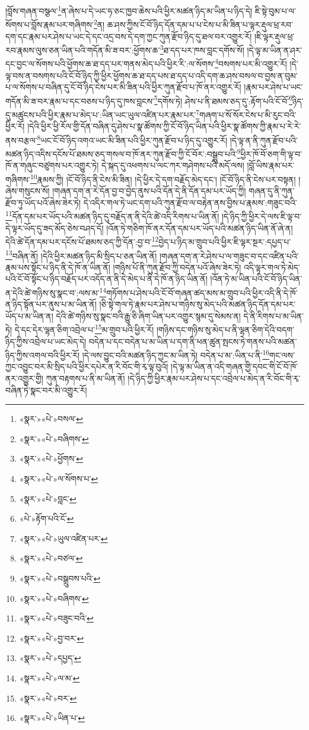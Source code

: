 །བློས་གཞན་བསྩལ་\footnote{«སྣར་»«པེ་»བསལ་}ན་ཞེས་པ་དེ་ཡང་ཧ་ཅང་ཁྱབ་ཆེས་པའི་ཕྱིར་མཚན་ཉིད་མ་ཡིན་པ་ཉིད་དེ། ཇི་སྟེ་བུམ་པ་ལ་སོགས་པ་བློས་རྣམ་པར་གཞིགས་\footnote{«སྣར་»«པེ་»བཞིགས་}ན། ཆ་ཤས་ཀྱིས་ངོ་བོ་ཉིད་དོན་དམ་པ་པ་ངེས་པ་མི་ཟིན་པ་ལྟར་རྡུལ་ཕྲ་རབ་དག་དང་རྣམ་པར་ཤེས་པ་ཡང་དེ་དང་འདྲ་བས་དེ་དག་ཀྱང་ཀུན་རྫོབ་ཉིད་དུ་ཐལ་བར་འགྱུར་རོ། །ཇི་ལྟར་རྡུལ་ཕྲ་རབ་རྣམས་ལུས་ཅན་ཡིན་པའི་གདོན་མི་ཟ་བར་:ཕྱོགས་ཆ་\footnote{«སྣར་»«པེ་»ཕྱོགས་}ཐ་དད་པར་ཁས་བླང་དགོས་སོ། །དེ་ལྟ་མ་ཡིན་ན་ཤར་དང་བྱང་ལ་སོགས་པའི་ཕྱོགས་ཆ་ཐ་དད་པར་གནས་མེད་པའི་ཕྱིར་རི་:ལ་སོགས་\footnote{«སྣར་»«པེ་»ལ་སོགས་པ་}བསགས་པར་མི་འགྱུར་རོ། །དེ་ལྟ་བས་ན་བསགས་པའི་ངོ་བོ་ཉིད་ཀྱི་ཕྱིར་ཕྱོགས་ཆ་ཐ་དད་པས་ཐ་དད་པ་འདི་དག་ཆ་ཤས་བསལ་བ་བྱས་ན་བུམ་པ་ལ་སོགས་པ་བཞིན་དུ་ངོ་བོ་ཉིད་ངེས་པར་མི་ཟིན་པའི་ཕྱིར་ཀུན་རྫོབ་པ་ཁོ་ནར་འགྱུར་རོ། །རྣམ་པར་ཤེས་པ་ཡང་གདོན་མི་ཟ་བར་རྣམ་པ་དང་བཅས་པ་ཉིད་དུ་ཁས་བླངས་\footnote{«སྣར་»«པེ་»བླང་}དགོས་ཏེ། ཤེས་པ་ནི་ཐམས་ཅད་དུ་:རྟོག་པའི་ངོ་བོ་\footnote{«པེ་»རྟོག་པའི་ངོ་}ཉིད་དུ་མཚུངས་པའི་ཕྱིར་རྣམ་པ་མེད་པ་:ཡིན་ཡང་ཡུལ་འཛིན་པར་རྣམ་པར་\footnote{«སྣར་»«པེ་»ཡུལ་འཛིན་པར་}གཞག་པ་སོ་སོར་ངེས་པ་མི་རུང་བའི་ཕྱིར་རོ། །དེའི་ཕྱིར་ཕྱི་རོལ་གྱི་དོན་བཞིན་དུ་ཤེས་པ་སྣ་ཚོགས་ཀྱི་ངོ་བོ་ཉིད་ཡིན་པའི་ཕྱིར་སྣ་ཚོགས་ཀྱི་རྣམ་པ་རེ་རེ་ནས་བརྩལ་\footnote{«སྣར་»«པེ་»བཙལ་}ཡང་ངོ་བོ་ཉིད་འགའ་ཡང་མི་ཟིན་པའི་ཕྱིར་ཀུན་རྫོབ་པ་ཉིད་དུ་འགྱུར་རོ། །དེ་ལྟ་ན་ནི་ཀུན་རྫོབ་པའི་མཚན་ཉིད་འདིས་དངོས་པོ་ཐམས་ཅད་གསལ་བ་ཁོ་ནར་ཀུན་རྫོབ་ཀྱི་ངོ་བོར་:བསྒྲུབ་པའི་\footnote{«སྣར་»«པེ་»བསྒྲུབས་པའི་}ཕྱིར་ཁོ་བོ་ཅག་གི་ལྟ་བ་ཁོ་ན་གཞུང་བཙུགས་པར་འགྱུར་ཏེ། དེ་སྐད་དུ་འཕགས་པ་ལང་ཀར་གཤེགས་པའི་མདོ་ལས། །བློ་ཡིས་རྣམ་པར་གཞིགས་\footnote{«སྣར་»«པེ་»བཞིགས་}རྣམས་ཀྱི། །ངོ་བོ་ཉིད་ནི་ངེས་མི་ཟིན། །དེ་ཕྱིར་དེ་དག་བརྗོད་མེད་དང་། །ངོ་བོ་ཉིད་ནི་ངེས་པར་བསྟན། །ཞེས་གསུངས་སོ། །གཞན་དག་ན་རེ་དོན་བྱ་བ་བྱེད་ནུས་པའི་དོན་དེ་ནི་དོན་དམ་པར་ཡོད་ཀྱི། གཞན་དུ་ནི་ཀུན་རྫོབ་ཏུ་ཡོད་པའོ་ཞེས་ཟེར་ཏེ། དེ་འདིར་གལ་ཏེ་ཡང་དག་པའི་ཀུན་རྫོབ་ལ་བརྟེན་ནས་བྱིས་པ་རྣམས་:གཟུང་བའི་\footnote{«སྣར་»«པེ་»བཟུང་བའི་}དོན་དམ་པར་ཡོད་པའི་མཚན་ཉིད་དུ་བརྗོད་ན་ནི་དེའི་ཚེ་འདི་རིགས་པ་ཡིན་ནོ། །དེ་ཉིད་ཀྱི་ཕྱིར་དེ་ལས་ཇི་ལྟ་བ་དེ་ལྟར་ཡོད་དུ་ཟད་མོད་ཅེས་བཤད་དོ། །འོན་ཏེ་གཅིག་ཁོ་ནར་དོན་དམ་པར་ཡོད་པའི་མཚན་ཉིད་ཡིན་ནོ་ཞེ་ན། དེའི་ཚེ་དོན་དམ་པར་དངོས་པོ་ཐམས་ཅད་ཀྱི་དོན་:བྱ་བ་\footnote{«སྣར་»«པེ་»བྱ་བར་}བྱེད་པ་ཉིད་མ་གྲུབ་པའི་ཕྱིར་ཇི་ལྟར་སྔར་:དཔྱད་པ་\footnote{«སྣར་»«པེ་»དཔྱད་}བཞིན་ནོ། །དེའི་ཕྱིར་མཚན་ཉིད་མི་སྲིད་པ་ཅན་ཡིན་ནོ། །གཞན་དག་ན་རེ་ཤེས་པ་ལ་གཟུང་བ་དང་འཛིན་པའི་རྣམ་པས་སྟོང་པ་ཉིད་ནི་དེ་ཁོ་ན་ཡིན་ནོ། །གཉིས་པོ་ནི་ཀུན་རྫོབ་ཀྱི་བདེན་པའོ་ཞེས་ཟེར་ཏེ། འདི་ལྟར་གལ་ཏེ་མེད་པའི་ངོ་བོ་སྟོང་པ་ཉིད་བརྗོད་པར་འདོད་ན་ནི་དེ་མེད་པ་ནི་དེ་ཁོ་ན་ཉིད་ཡིན་ནོ། །འོན་ཏེ་མ་ཡིན་པའི་ངོ་བོ་ཉིད་ཡིན་ན་དེའི་ཚེ་གཉིས་སུ་སྣང་བ་:ལས་མ་\footnote{«སྣར་»«པེ་»ལ་མ་}གཏོགས་པ་ཤེས་པའི་ངོ་བོ་གཞན་ཚད་མས་མ་གྲུབ་པའི་ཕྱིར་འདི་ནི་དེ་ཁོ་ན་ཉིད་སྟོན་པར་ནུས་པ་མ་ཡིན་ནོ། །ཅི་སྟེ་གལ་ཏེ་རྣམ་པར་ཤེས་པ་གཉིས་སུ་མེད་པའི་མཚན་ཉིད་དོན་དམ་པར་ཡོད་པ་མ་ཡིན་ན། དེའི་ཚེ་གཉིས་སུ་སྣང་བའི་རྒྱུ་ཅི་ཞིག་ཡིན་པར་འགྱུར་སྙམ་དུ་སེམས་ན། དེ་ནི་རིགས་པ་མ་ཡིན་ཏེ། དེ་དང་དེར་ལྷན་ཅིག་འབྲེལ་པ་\footnote{«སྣར་»«པེ་»བར་}མ་གྲུབ་པའི་ཕྱིར་རོ། །གཉིས་དང་གཉིས་སུ་མེད་པ་ནི་ལྷན་ཅིག་དེའི་བདག་ཉིད་ཀྱིས་འབྲེལ་པ་ཡང་མེད་དེ། བདེན་པ་དང་བདེན་པ་མ་ཡིན་པ་དག་ནི་ཕན་ཚུན་སྤངས་ཏེ་གནས་པའི་མཚན་ཉིད་ཀྱིས་འགལ་བའི་ཕྱིར་རོ། །དེ་ལས་བྱུང་བའི་མཚན་ཉིད་ཀྱང་མ་ཡིན་ཏེ། བདེན་པ་མ་:ཡིན་པ་ནི་\footnote{«སྣར་»«པེ་»ཡིན་པ་}གང་ལས་ཀྱང་འབྱུང་བར་མི་སྲིད་པའི་ཕྱིར་དཔེར་ན་རི་བོང་གི་རྭ་ལྟ་བུའོ། །དེ་ལྟ་མ་ཡིན་ན་འདི་གཞན་གྱི་དབང་གི་ངོ་བོ་ཁོ་ནར་འགྱུར་གྱི། ཀུན་བརྟགས་པ་ནི་མ་ཡིན་ནོ། །དེ་ཉིད་ཀྱི་ཕྱིར་རྣམ་པར་ཤེས་པ་དང་འབྲེལ་པ་མེད་ན་རི་བོང་གི་རྭ་བཞིན་ཏེ་སྣང་བར་མི་འགྱུར་རོ། 